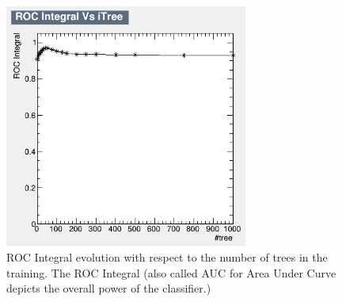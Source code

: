 \documentclass{cernatlasnote}
\begin{document}
\begin{appendices}
\begin{figure}[ht]
\centering
\includegraphics[height=8cm, width=8cm, trim= 0cm 0cm 0cm 0cm,clip]{images/TRKBDT/BDTDaniel_CONV.png}
\caption{\label{fig:BDTCONV} ROC Integral evolution with respect to the number of trees in the training. The ROC Integral (also called AUC for Area Under Curve depicts the overall power of the classifier.)}
\end{figure} 

\end{appendices}


\FloatBarrier
\pagebreak




\end{document}
